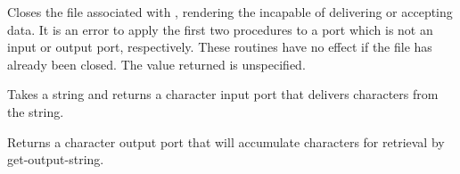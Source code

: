\begin{entry}{%
}

Closes the file associated with , rendering the 
incapable of delivering or accepting data.    It is an error
to apply the first two procedures to a port which is not an input
or output port, respectively.
These routines have no effect if the file has already been closed.
The value returned is unspecified.



\end{entry}


\begin{entry}{%
}

Takes a string and returns a character input port that delivers
characters from the string.


\end{entry}

\begin{entry}{%
}

Returns a character output port that will accumulate characters for
retrieval by {\cf get-output-string}.

\end{entry}

